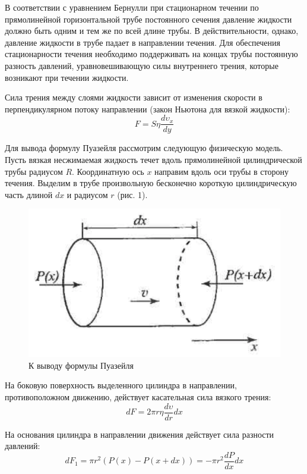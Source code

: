 \documentclass[a4paper,12pt]{article}
\theoremstyle{plain} %
\theoremstyle{definition} %
\theoremstyle{remark} %
\begin{document}
В соответствии с уравнением Бернулли при стационарном течении по прямолинейной горизонтальной трубе постоянного сечения давление жидкости должно быть одним и тем же по всей длине трубы. В действительности, однако, давление жидкости в трубе падает в направлении течения. Для обеспечения стационарности течения необходимо поддерживать на концах трубы постоянную разность давлений, уравновешивающую силы внутреннего трения, которые возникают при течении жидкости.

Сила трения между слоями жидкости зависит от изменения скорости в перпендикулярном потоку направлении (закон Ньютона для вязкой жидкости):
\begin{equation}
F = S\eta\frac{d\upsilon_x}{dy}
\end{equation}

Для вывода формулу Пуазейля рассмотрим следующую физическую модель. Пусть вязкая несжимаемая жидкость течет вдоль прямолинейной цилиндрической трубы радиусом $R$. Координатную ось $x$ направим вдоль оси трубы в сторону течения. Выделим в трубе произвольную бесконечно короткую цилиндрическую часть длиной $dx$ и радиусом $r$ (рис. 1).

\begin{figure}
\label{1}
\includegraphics[width=\linewidth]{1}
\caption{К выводу формулы Пуазейля}
\end{figure}
На боковую поверхность выделенного цилиндра в направлении, противоположном движению, действует касательная сила вязкого трения:
\begin{equation}
dF = 2\pi r\eta\frac{d\upsilon}{dr}dx
\end{equation}

На основания цилиндра в направлении движения действует сила разности давлений:
\begin{equation}
dF_1 = \pi r^2 (P(x)-P(x+dx)) = -\pi r^2\frac{dP}{dx}dx
\end{equation}
\end{document}
